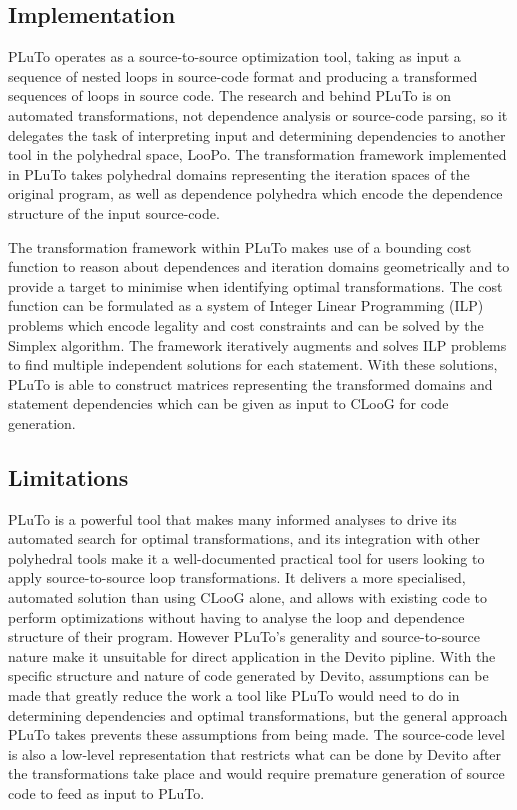 \documentclass[a4paper,12pt,twoside]{report}
\begin{document}
\begin{itemize}
\subsection{Implementation}
PLuTo operates as a source-to-source optimization tool, taking as input a sequence of nested loops in source-code format
and producing a transformed sequences of loops in source code. The research and behind PLuTo is on automated transformations,
not dependence analysis or source-code parsing, so it delegates the task of interpreting input and determining dependencies
to another tool in the polyhedral space, LooPo. The transformation framework implemented in PLuTo takes polyhedral domains representing the iteration
spaces of the original program, as well as dependence polyhedra which encode the dependence structure of the input source-code.

The transformation framework within PLuTo makes use of a bounding cost function to reason about dependences and iteration domains
geometrically and to provide a target to minimise when identifying optimal transformations. The cost function can be formulated
as a system of Integer Linear Programming (ILP) problems which encode legality and cost constraints and can be solved by the Simplex
algorithm. The framework iteratively augments and solves ILP problems to find multiple independent solutions for each statement. With
these solutions, PLuTo is able to construct matrices representing the transformed domains and statement dependencies which can be
given as input to CLooG for code generation.

\subsection{Limitations}
PLuTo is a powerful tool that makes many informed analyses to drive its automated search for optimal transformations, and its integration
with other polyhedral tools make it a well-documented practical tool for users looking to apply source-to-source loop transformations. It
delivers a more specialised, automated solution than using CLooG alone, and allows with existing code to perform optimizations without having to 
analyse the loop and dependence structure of their program. However
PLuTo's generality and source-to-source nature make it unsuitable for direct application in the Devito pipline. With the specific structure and
nature of code generated by Devito, assumptions can be made that greatly reduce the work a tool like PLuTo would need to do in determining
dependencies and optimal transformations, but the general approach PLuTo takes prevents these assumptions from being made. The source-code level
is also a low-level representation that restricts what can be done by Devito after the transformations take place and would require premature
generation of source code to feed as input to PLuTo.


\end{itemize}
\end{document}

